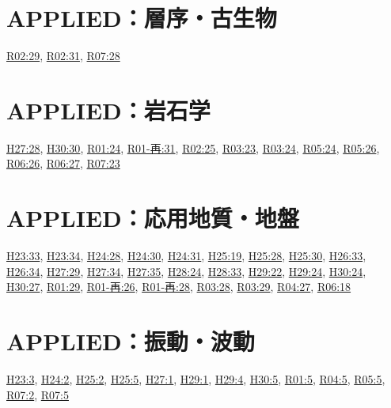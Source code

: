 \section{APPLIED：層序・古生物}
\hyperref[q:r02-reg-applied-29]{R02:29}, \hyperref[q:r02-reg-applied-31]{R02:31}, \hyperref[q:r07-reg-applied-28]{R07:28}
\section{APPLIED：岩石学}
\hyperref[q:h27-reg-applied-28]{H27:28}, \hyperref[q:h30-reg-applied-30]{H30:30}, \hyperref[q:r01-reg-applied-24]{R01:24}, \hyperref[q:r01-ret-applied-31]{R01-再:31}, \hyperref[q:r02-reg-applied-25]{R02:25}, \hyperref[q:r03-reg-applied-23]{R03:23}, \hyperref[q:r03-reg-applied-24]{R03:24}, \hyperref[q:r05-reg-applied-24]{R05:24}, \hyperref[q:r05-reg-applied-26]{R05:26}, \hyperref[q:r06-reg-applied-26]{R06:26}, \hyperref[q:r06-reg-applied-27]{R06:27}, \hyperref[q:r07-reg-applied-23]{R07:23}
\section{APPLIED：応用地質・地盤}
\hyperref[q:h23-reg-applied-33]{H23:33}, \hyperref[q:h23-reg-applied-34]{H23:34}, \hyperref[q:h24-reg-applied-28]{H24:28}, \hyperref[q:h24-reg-applied-30]{H24:30}, \hyperref[q:h24-reg-applied-31]{H24:31}, \hyperref[q:h25-reg-applied-19]{H25:19}, \hyperref[q:h25-reg-applied-28]{H25:28}, \hyperref[q:h25-reg-applied-30]{H25:30}, \hyperref[q:h26-reg-applied-33]{H26:33}, \hyperref[q:h26-reg-applied-34]{H26:34}, \hyperref[q:h27-reg-applied-29]{H27:29}, \hyperref[q:h27-reg-applied-34]{H27:34}, \hyperref[q:h27-reg-applied-35]{H27:35}, \hyperref[q:h28-reg-applied-24]{H28:24}, \hyperref[q:h28-reg-applied-33]{H28:33}, \hyperref[q:h29-reg-applied-22]{H29:22}, \hyperref[q:h29-reg-applied-24]{H29:24}, \hyperref[q:h30-reg-applied-24]{H30:24}, \hyperref[q:h30-reg-applied-27]{H30:27}, \hyperref[q:r01-reg-applied-29]{R01:29}, \hyperref[q:r01-ret-applied-26]{R01-再:26}, \hyperref[q:r01-ret-applied-28]{R01-再:28}, \hyperref[q:r03-reg-applied-28]{R03:28}, \hyperref[q:r03-reg-applied-29]{R03:29}, \hyperref[q:r04-reg-applied-27]{R04:27}, \hyperref[q:r06-reg-applied-18]{R06:18}
\section{APPLIED：振動・波動}
\hyperref[q:h23-reg-applied-03]{H23:3}, \hyperref[q:h24-reg-applied-02]{H24:2}, \hyperref[q:h25-reg-applied-02]{H25:2}, \hyperref[q:h25-reg-applied-05]{H25:5}, \hyperref[q:h27-reg-applied-01]{H27:1}, \hyperref[q:h29-reg-applied-01]{H29:1}, \hyperref[q:h29-reg-applied-04]{H29:4}, \hyperref[q:h30-reg-applied-05]{H30:5}, \hyperref[q:r01-reg-applied-05]{R01:5}, \hyperref[q:r04-reg-applied-05]{R04:5}, \hyperref[q:r05-reg-applied-05]{R05:5}, \hyperref[q:r07-reg-applied-02]{R07:2}, \hyperref[q:r07-reg-applied-05]{R07:5}
